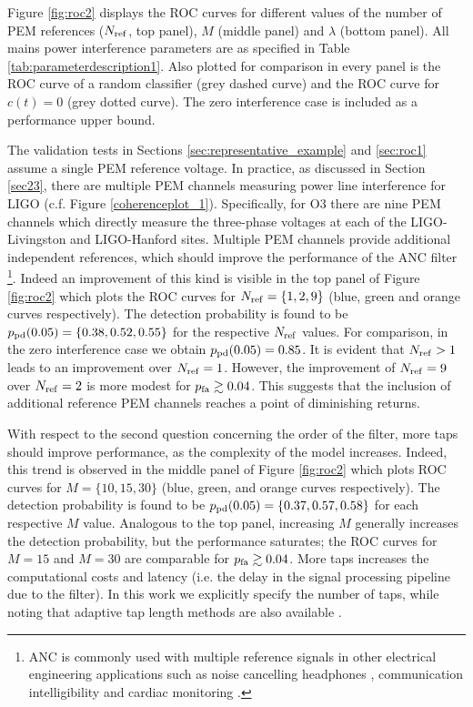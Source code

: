 \documentclass[pra,superscriptaddress,reprint,amsmath,amssymb,nofootinbib]{revtex4-2}
\begin{document}
Figure \ref{fig:roc2} displays the ROC curves for different values of the number of PEM references ($N_{\rm ref}$, top panel), $M$ (middle panel) and $\lambda$ (bottom panel). All mains power interference parameters are as specified in Table \ref{tab:parameterdescription1}. Also plotted for comparison in every panel is the ROC curve of a random classifier (grey dashed curve) and the ROC curve for $c(t) = 0$ (grey dotted curve). The zero interference case is included as a performance upper bound. \newline 

The validation tests in Sections \ref{sec:representative_example} and \ref{sec:roc1} assume a single PEM reference voltage. In practice, as discussed in Section \ref{sec23}, there are multiple PEM channels measuring power line interference for LIGO (c.f. Figure \ref{coherenceplot_1}). Specifically, for O3 there are nine PEM channels which directly measure the three-phase voltages at each of the LIGO-Livingston and LIGO-Hanford sites. Multiple PEM channels provide additional independent references, which should improve the performance of the ANC filter \footnote{ANC is commonly used with multiple reference signals in other electrical engineering applications such as noise cancelling headphones \citep{10.1121/1.5109394}, communication intelligibility \citep{KUO1996669,doi:10.1177/1084713812456906} and cardiac monitoring \citep{7755741}.}. Indeed an improvement of this kind is visible in the top panel of Figure \ref{fig:roc2} which plots the ROC curves for $N_{\rm ref} = \{ 1,2,9 \}$ (blue, green and orange curves respectively). The detection probability is found to be $p_{\rm pd} (0.05) = \{ 0.38,0.52,0.55 \}$ for the respective $N_{\rm ref}$ values. For comparison, in the zero interference case we obtain $p_{\rm pd}(0.05) = 0.85$. It is evident that $N_{\rm ref} > 1$ leads to an improvement over $N_{\rm ref} = 1$. However, the improvement of $N_{\rm ref} =9$ over $N_{\rm ref} =2$ is more modest for $p_{\rm fa} \gtrsim 0.04$. This suggests that the inclusion of additional reference PEM channels reaches a point of diminishing returns. \newline 


With respect to the second question concerning the order of the filter, more taps should improve performance, as the complexity of the model increases. Indeed, this trend is observed in the middle panel of Figure \ref{fig:roc2}  which plots ROC curves for $M = \{10,15,30\}$ (blue, green, and orange curves respectively). The detection probability is found to be $p_{\rm pd} (0.05) = \{0.37, 0.57, 0.58\}$ for each respective $M$ value. Analogous to the top panel, increasing $M$ generally increases the detection probability, but the performance saturates; the ROC curves for $M=15$ and $M=30$ are comparable for $p_{\rm fa} \gtrsim 0.04$. More taps increases the computational costs and latency (i.e. the delay in the signal processing pipeline due to the filter). In this work we explicitly specify the number of taps, while noting that adaptive tap length methods are also available \citep[e.g.][]{1326385,KAR2017422,KAR2020107043}. \newline 
\end{document}
